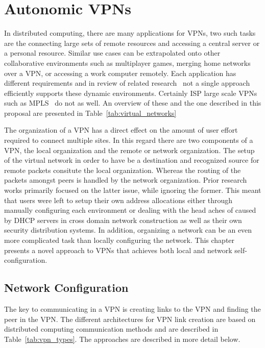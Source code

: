 \chapter{Autonomic VPNs}
\label{vpns}
In distributed computing, there are many applications for VPNs, two such tasks
are the connecting large sets of remote resources and accessing a central
server or a personal resource.  Similar use cases can be extrapolated onto
other collaborative environments such as multiplayer games, merging home
networks over a VPN, or accessing a work computer remotely.  Each application
has different requirements and in review of related research~\cite{ipop, vine,
violin, vnet, ocala, softudc, openvpn, hamachi, wippien, gbridge, pvc, tinc,
n2n, p2pvpn, l2tp} not a single approach efficiently supports these dynamic
environments.  Certainly ISP large scale VPNs such as MPLS~\cite{mpls} do not
as well.  An overview of these and the one described in this proposal are
presented in Table~\ref{tab:virtual_networks}

The organization of a VPN has a direct effect on the amount of user effort
required to connect multiple sites.  In this regard there are two components of
a VPN, the local organization and the remote or network organization.  The setup
of the virtual network in order to have be a destination and recognized source
for remote packets consitute the local organization.  Whereas the routing of
the packets amongst peers is handled by the network organization.  Prior
research works primarily focused on the latter issue, while ignoring the former.
This meant that users were left to setup their own address allocations either
through manually configuring each environment or dealing with the head aches of
caused by DHCP servers in cross domain network construction as well as their
own security distribution systems.  In addition, organizing a network can be an
even more complicated task than locally configuring the network.  This chapter
presents a novel approach to VPNs that achieves both local and network
self-configuration.

\section{Network Configuration}
The key to communicating in a VPN is creating links to the VPN and finding
the peer in the VPN.  The different architectures for VPN link creation are
based on distributed computing communication methods and are described in
Table~\ref{tab:vpn_types}.  The approaches are described in more detail
below.


